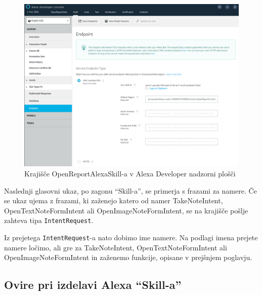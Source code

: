 \documentclass[a4paper, 12pt]{book}
\begin{document}
\begin{figure}[H]
\begin{center}
\includegraphics[width=13cm]{skill_endpoint}
\end{center}
\caption{Krajišče OpenReportAlexaSkill-a v Alexa Developer nadzorni plošči}
\label{skill_endpoint}
\end{figure}

Naslednji glasovni ukaz, po zagonu \enquote{Skill-a}, se primerja s frazami za namere.
Če se ukaz ujema z frazami, ki zaženejo katero od namer TakeNoteIntent, OpenTextNoteFormIntent ali OpenImageNoteFormIntent, se na krajišče pošlje zahteva tipa \texttt{IntentRequest}.

Iz prejetega \texttt{IntentRequest}-a nato dobimo ime namere.
Na podlagi imena prejete namere ločimo, ali gre za TakeNoteIntent, OpenTextNoteFormIntent ali OpenImageNoteFormIntent in zaženemo funkcije, opisane v prejšnjem poglavju.

% 

\subsection{Ovire pri izdelavi Alexa \enquote{Skill-a}}
\end{document}
